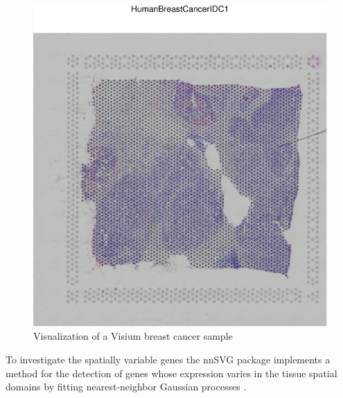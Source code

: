 \begin{figure}
\includegraphics[width=1\linewidth,]{spatpdfs/tenxvisium-1} \caption{Visualization of a Visium breast cancer sample}\label{fig:tenxvisium}
\end{figure}

To investigate the spatially variable genes the nnSVG package
implements a method for the detection of genes whose expression varies in the
tissue spatial domains by fitting nearest-neighbor Gaussian processes 
\cite{webr23}.

